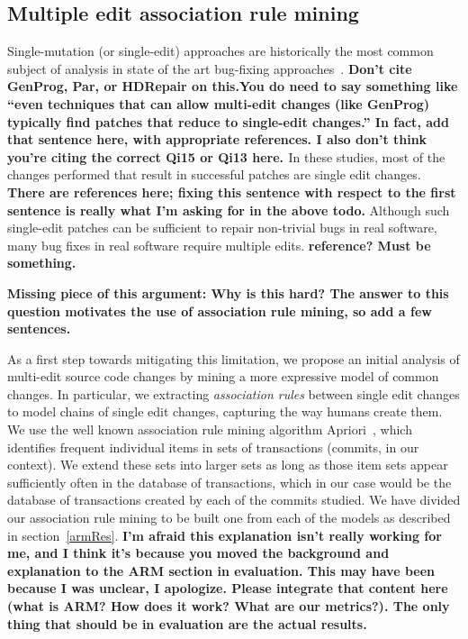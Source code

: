 \documentclass[conference]{IEEEtran}
\newcommand{\todo}[1]
  {{\scriptsize \textbf{\color{red} {#1}}}}
\begin{document}
\subsection{Multiple edit association rule mining} 
\label{multEdit}

Single-mutation (or single-edit) approaches are historically the most 
common subject of analysis in 
state of the art bug-fixing
approaches~\cite{Qi15,fan15,kim2013,Long2016,Qi13,Qi14}.
\todo{Don't cite GenProg, Par, or HDRepair on this.You do need to say something like ``even
  techniques that can allow multi-edit changes (like GenProg) typically find
  patches that reduce to single-edit changes.''  In fact, add that sentence
  here, with appropriate references.   I also don't think you're
  citing the correct Qi15 or Qi13 here.  }
In these studies, most of the changes performed that result in 
successful patches are single edit changes.\todo{There are references here;
  fixing this sentence with respect to the first sentence is really what I'm
  asking for in the above todo.}  Although such single-edit patches can be
sufficient to repair non-trivial bugs in real software, many bug fixes in real
software require multiple edits.\todo{reference?  Must be something.}

\todo{Missing piece of this argument: Why is this hard?  The answer to this question motivates the use of association
  rule mining, so add a few sentences.}

As a first step towards mitigating this limitation, we propose 
an initial analysis of multi-edit 
source code changes by mining a more expressive model of common changes. In
particular, we extracting \emph{association rules} between single edit changes 
to model chains of single edit changes, capturing the way humans create them.
%
We use the 
well known association rule mining algorithm
Apriori~\cite{Agrawal94,Liu98,Zaki2000}, which identifies frequent 
individual items in sets of transactions (commits, in our context).  We extend these sets into 
larger sets as long as those item sets appear sufficiently often in the database 
of transactions, which in our case would be the database of transactions created 
by each of the commits studied. We have divided our association rule mining to
be built one from each of the models as described in section~\ref{armRes}. 
\todo{I'm afraid this explanation isn't really working for me, and I think it's
  because you moved the background and explanation to the ARM section in
  evaluation.  This may have been because I was unclear, I apologize.  Please
  integrate that content here (what is ARM?  How does it work?  What are our
  metrics?).  The only thing that should be in evaluation are the actual
  results.} 
\end{document}
